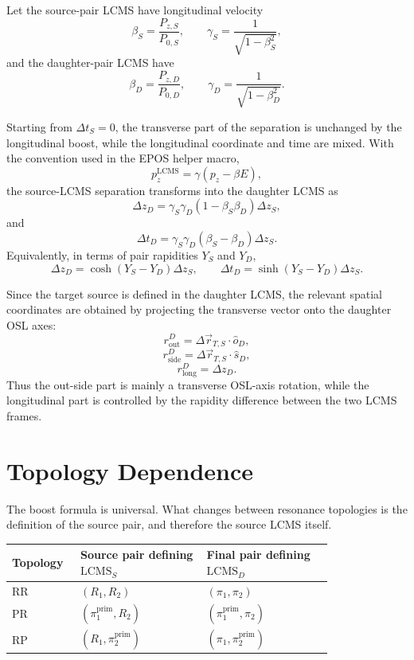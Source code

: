 \documentclass[11pt,a4paper]{article}
\begin{document}
Let the source-pair LCMS have longitudinal velocity
\[
  \beta_S = \frac{P_{z,S}}{P_{0,S}},
  \qquad
  \gamma_S = \frac{1}{\sqrt{1-\beta_S^2}},
\]
and the daughter-pair LCMS have
\[
  \beta_D = \frac{P_{z,D}}{P_{0,D}},
  \qquad
  \gamma_D = \frac{1}{\sqrt{1-\beta_D^2}}.
\]

Starting from \(\Delta t_S = 0\), the transverse part of the separation is
unchanged by the longitudinal boost, while the longitudinal coordinate and time
are mixed. With the convention used in the EPOS helper macro,
\[
  p_z^{\mathrm{LCMS}} =
  \gamma (p_z - \beta E),
\]
the source-LCMS separation transforms into the daughter LCMS as
\[
  \Delta z_D =
  \gamma_S \gamma_D
  (1 - \beta_S \beta_D)
  \Delta z_S,
\]
and
\[
  \Delta t_D =
  \gamma_S \gamma_D
  (\beta_S - \beta_D)
  \Delta z_S.
\]
Equivalently, in terms of pair rapidities \(Y_S\) and \(Y_D\),
\[
  \Delta z_D =
  \cosh(Y_S - Y_D)\Delta z_S,
  \qquad
  \Delta t_D =
  \sinh(Y_S - Y_D)\Delta z_S.
\]

Since the target source is defined in the daughter LCMS, the relevant spatial
coordinates are obtained by projecting the transverse vector onto the daughter
OSL axes:
\[
  r_{\mathrm{out}}^D =
  \Delta \vec{r}_{T,S} \cdot \hat{o}_D,
\]
\[
  r_{\mathrm{side}}^D =
  \Delta \vec{r}_{T,S} \cdot \hat{s}_D,
\]
\[
  r_{\mathrm{long}}^D =
  \Delta z_D.
\]
Thus the out-side part is mainly a transverse OSL-axis rotation, while the
longitudinal part is controlled by the rapidity difference between the two LCMS
frames.

\section{Topology Dependence}

The boost formula is universal. What changes between resonance topologies is
the definition of the source pair, and therefore the source LCMS itself.

\begin{center}
\begin{tabular}{>{\raggedright\arraybackslash}p{0.12\linewidth}
                >{\raggedright\arraybackslash}p{0.34\linewidth}
                >{\raggedright\arraybackslash}p{0.34\linewidth}}
\toprule
Topology & Source pair defining \(\mathrm{LCMS}_S\) & Final pair defining \(\mathrm{LCMS}_D\) \\
\midrule
RR &
\((R_1, R_2)\) &
\((\pi_1, \pi_2)\) \\
PR &
\((\pi_1^{\mathrm{prim}}, R_2)\) &
\((\pi_1^{\mathrm{prim}}, \pi_2)\) \\
RP &
\((R_1, \pi_2^{\mathrm{prim}})\) &
\((\pi_1, \pi_2^{\mathrm{prim}})\) \\
\bottomrule
\end{tabular}
\end{center}
\end{document}
